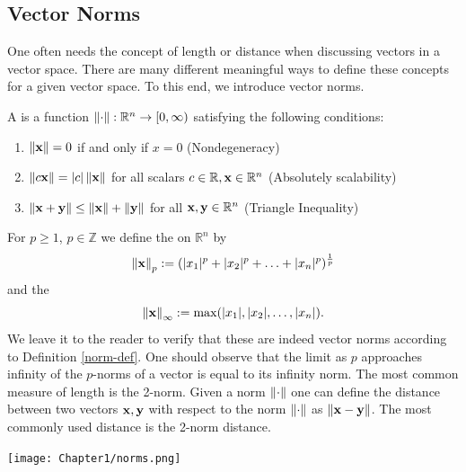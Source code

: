 \subsection{Vector Norms}

One often needs the concept of length or distance when discussing vectors in a vector space. There are many different meaningful ways to define these concepts for a given vector space. To this end, we introduce vector norms.

\begin{definition}\label{norm-def}
A  is a function $\norm{\cdot} : \R^n \rightarrow [0, \infty)$ satisfying the following conditions: 
\begin{enumerate}
\item $\norm{\vx} = 0$ if and only if $x = 0$ (Nondegeneracy)
\item $\norm{c\vx} = |c| \norm{\vx}$ for all scalars $c \in \R, \vx \in \R^n$ (Absolutely scalability) 
\item $\norm{\vx + \vy} \leq \norm{\vx} + \norm{\vy}$ for all $\vx,\vy \in \R^n$ (Triangle Inequality)
\end{enumerate}
\end{definition}

\begin{example}

For $p\geq 1$, $p\in\mathbb{Z}$ we define the  on $\mathbb{R}^n$ by
\begin{equation}
    \norm{\vx}_p : = (|x_1|^p + |x_2|^p + \ldots + |x_n|^p)^{\frac{1}{p}}
\end{equation}
and the 
\begin{equation}
    \norm{\vx}_{\infty} : = \max (|x_1|, |x_2|, \ldots, |x_n|).
\end{equation}
We leave it to the reader to verify that these are indeed vector norms according to Definition \ref{norm-def}. One should observe that the limit as $p$ approaches infinity of the $p$-norms of a vector is equal to its infinity norm. The most common measure of length is the 2-norm. Given a norm $\norm{\cdot}$ one can define the distance between two vectors $\vx,\vy$ with respect to the norm $\norm{\cdot}$ as $\norm{\vx-\vy}$. The most commonly used distance is the 2-norm distance.
\end{example}

\begin{center}
  \texttt{[image: Chapter1/norms.png]}
\end{center}


